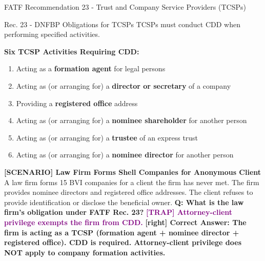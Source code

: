 \documentclass[11pt,a4paper]{beamer}
\newcommand{\trap}[1]{\textcolor{purple}{\textbf{[TRAP] #1}}}
\newcommand{\correct}[1]{\textcolor{green!50!black}{\textbf{[right] #1}}}
\newcommand{\scenario}[1]{\textcolor{blue!70!black}{\textbf{[SCENARIO] #1}}}
\begin{document}
\begin{frame}{FATF Recommendation 23 - Trust and Company Service Providers (TCSPs)}
\begin{block}{Rec. 23 - DNFBP Obligations for TCSPs}
TCSPs must conduct CDD when performing specified activities.
\end{block}
\textbf{Six TCSP Activities Requiring CDD:}
\begin{enumerate}
\item Acting as a \textbf{formation agent} for legal persons
\item Acting as (or arranging for) a \textbf{director or secretary} of a company
\item Providing a \textbf{registered office} address
\item Acting as (or arranging for) a \textbf{nominee shareholder} for another person
\item Acting as (or arranging for) a \textbf{trustee} of an express trust
\item Acting as (or arranging for) a \textbf{nominee director} for another person
\end{enumerate}
\scenario{Law Firm Forms Shell Companies for Anonymous Client}
A law firm forms 15 BVI companies for a client the firm has never met. The firm provides nominee directors and registered office addresses. The client refuses to provide identification or disclose the beneficial owner.
\vspace{0.2cm}
\textbf{Q: What is the law firm's obligation under FATF Rec. 23?}
\trap{Attorney-client privilege exempts the firm from CDD.}
\correct{Correct Answer: The firm is acting as a TCSP (formation agent + nominee director + registered office). CDD is required. Attorney-client privilege does NOT apply to company formation activities.}
\end{frame}

\end{document}
